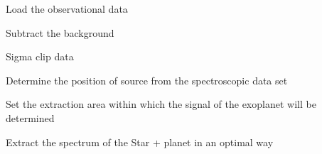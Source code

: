 \documentclass[a4paper,11pt,english]{sphinxmanual}
\begin{document}
Load the observational data

%
\begin{sphinxVerbatim}[commandchars=\\\{\}]
\end{sphinxVerbatim}

Subtract the background

%
\begin{sphinxVerbatim}[commandchars=\\\{\}]
\end{sphinxVerbatim}

Sigma clip data

%
\begin{sphinxVerbatim}[commandchars=\\\{\}]
\end{sphinxVerbatim}

Determine the position of source from the spectroscopic data set

%
\begin{sphinxVerbatim}[commandchars=\\\{\}]
\end{sphinxVerbatim}

Set the extraction area within which the signal of the exoplanet will be determined

%
\begin{sphinxVerbatim}[commandchars=\\\{\}]
\end{sphinxVerbatim}

Extract the spectrum of the Star + planet in an optimal way

%
\begin{sphinxVerbatim}[commandchars=\\\{\}]
\end{sphinxVerbatim}
\end{document}
